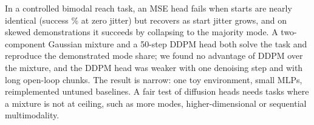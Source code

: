 In a controlled bimodal reach task, an MSE head fails when starts are nearly identical (success \% at zero jitter) but recovers as start jitter grows, and on skewed demonstrations it succeeds by collapsing to the majority mode. A two-component Gaussian mixture and a 50-step DDPM head both solve the task and reproduce the demonstrated mode share; we found no advantage of DDPM over the mixture, and the DDPM head was weaker with one denoising step and with long open-loop chunks. The result is narrow: one toy environment, small MLPs, reimplemented untuned baselines. A fair test of diffusion heads needs tasks where a mixture is not at ceiling, such as more modes, higher-dimensional or sequential multimodality.
